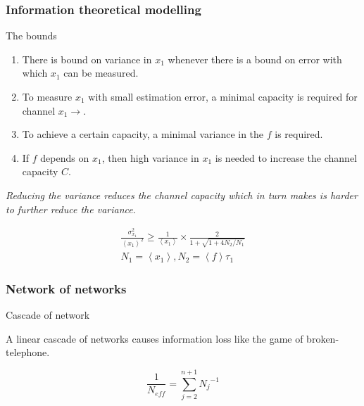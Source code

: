 \documentclass{beamer}
\begin{document}
\begin{frame}[fragile]
    \frametitle{Information theoretical modelling}
    
    \begin{block}{The bounds}
        \begin{enumerate}
                \small
            \item There is bound on variance in $x_1$ whenever there is a bound
                on error with which $x_1$ can be measured.
            \item To measure $x_1$ with small estimation error, a minimal
                capacity is required for channel $x_1 \rightarrow $.
            \item  To achieve a certain capacity, a minimal variance in the $f$
                is required.
            \item If $f$ depends on $x_1$, then high variance in $x_1$ is needed
                to increase the channel capacity $C$.
        \end{enumerate}

        \emph{Reducing the variance reduces the channel capacity which in turn
        makes is harder to further reduce the variance}.

    \end{block}

    \def\mean#1{\left< #1 \right>}
    \begin{eqnarray}
        \frac{\sigma_{x_1}^2}{\mean{x_1}^2} \geq 
        \frac{1}{\mean{x_1}} \times \frac{2}{1 + \sqrt{1+4N_2/N_1}} \\
        N_1 = \mean{x_1}, N_2 = \mean{f} \tau_1 
    \end{eqnarray}

\end{frame}
 
\begin{frame}
    \frametitle{Network of networks}

    \begin{block}{Cascade of network}

        A linear cascade of networks causes information loss like the game of
        broken-telephone.

        \newcommand\eqbox[3]
        {
            \node[rectangle] (eq#1) at #2  {$x_#1 \xrightarrow{#3} x_#1 + 1$};
            \node[rectangle,below of=eq#1] (#1_sub) {$x_#1
            \xrightarrow{x_#1/\tau_#1} x_#1 - 1$};
        }



        \begin{equation}
            \frac{1}{N_{eff}} = \sum_{j=2}^{n+1} {N_j}^{-1}
        \end{equation}

    \end{block}
\end{frame}
\end{document}
